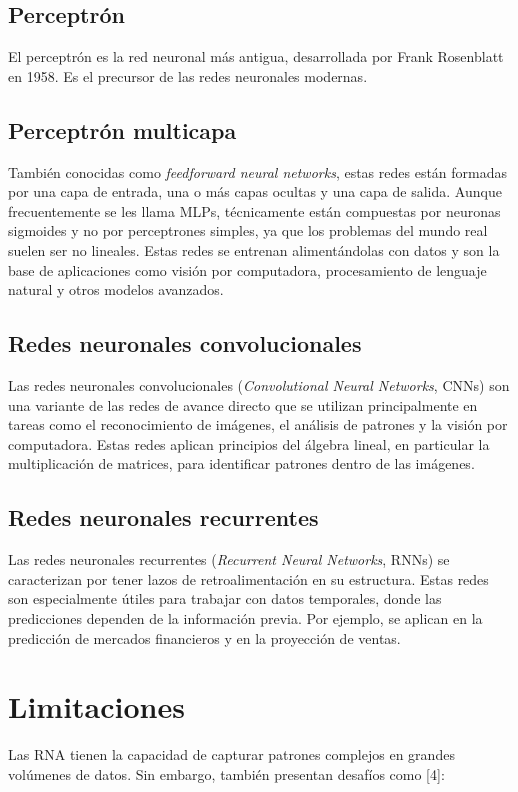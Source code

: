 \subsection{Perceptrón} 
El perceptrón es la red neuronal más antigua, desarrollada por Frank Rosenblatt en 1958. Es el precursor de las redes neuronales modernas.  

\subsection{Perceptrón multicapa} 
También conocidas como \textit{feedforward neural networks}, estas redes están formadas por una capa de entrada, una o más capas ocultas y una capa de salida. Aunque frecuentemente se les llama MLPs, técnicamente están compuestas por neuronas sigmoides y no por perceptrones simples, ya que los problemas del mundo real suelen ser no lineales. Estas redes se entrenan alimentándolas con datos y son la base de aplicaciones como visión por computadora, procesamiento de lenguaje natural y otros modelos avanzados.

\subsection{Redes neuronales convolucionales} 
Las redes neuronales convolucionales (\textit{Convolutional Neural Networks}, CNNs) son una variante de las redes de avance directo que se utilizan principalmente en tareas como el reconocimiento de imágenes, el análisis de patrones y la visión por computadora. Estas redes aplican principios del álgebra lineal, en particular la multiplicación de matrices, para identificar patrones dentro de las imágenes.

\subsection{Redes neuronales recurrentes} 
Las redes neuronales recurrentes (\textit{Recurrent Neural Networks}, RNNs) se caracterizan por tener lazos de retroalimentación en su estructura. Estas redes son especialmente útiles para trabajar con datos temporales, donde las predicciones dependen de la información previa. Por ejemplo, se aplican en la predicción de mercados financieros y en la proyección de ventas.


\section{Limitaciones}
Las RNA tienen la capacidad de capturar patrones complejos en grandes volúmenes de datos. Sin embargo, también presentan desafíos como [4]:

